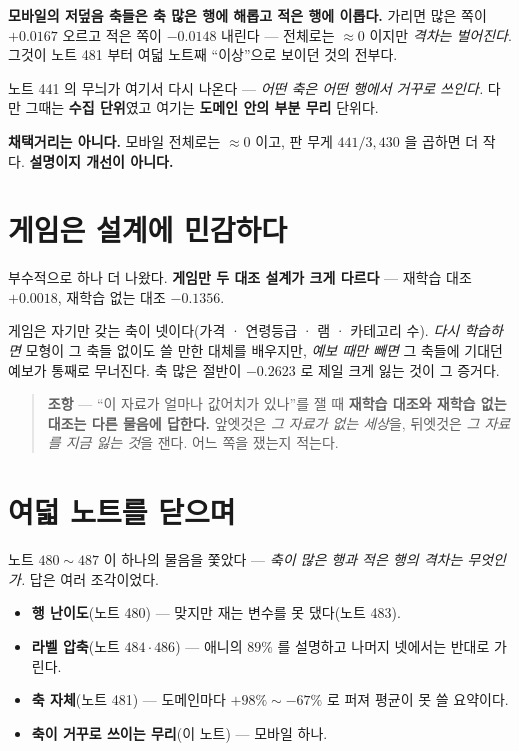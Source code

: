 \documentclass[11pt]{article}
\begin{document}
\textbf{모바일의 저덮음 축들은 축 많은 행에 해롭고 적은 행에 이롭다.}
가리면 많은 쪽이 $+0.0167$ 오르고 적은 쪽이 $-0.0148$ 내린다 --- 전체로는
$\approx 0$ 이지만 \emph{격차는 벌어진다}. 그것이 노트 481 부터 여덟
노트째 ``이상''으로 보이던 것의 전부다.

노트 441 의 무늬가 여기서 다시 나온다 --- \emph{어떤 축은 어떤 행에서
거꾸로 쓰인다.} 다만 그때는 \textbf{수집 단위}였고 여기는 \textbf{도메인
안의 부분 무리} 단위다.

\textbf{채택거리는 아니다.} 모바일 전체로는 $\approx 0$ 이고, 판 무게
$441/3{,}430$ 을 곱하면 더 작다. \textbf{설명이지 개선이 아니다.}

\section{게임은 설계에 민감하다}

부수적으로 하나 더 나왔다. \textbf{게임만 두 대조 설계가 크게 다르다}
--- 재학습 대조 $+0.0018$, 재학습 없는 대조 $-0.1356$.

게임은 자기만 갖는 축이 넷이다(가격 · 연령등급 · 램 · 카테고리 수).
\emph{다시 학습하면} 모형이 그 축들 없이도 쓸 만한 대체를 배우지만,
\emph{예보 때만 빼면} 그 축들에 기대던 예보가 통째로 무너진다. 축 많은
절반이 $-0.2623$ 로 제일 크게 잃는 것이 그 증거다.

\begin{quote}
\textbf{조항} --- ``이 자료가 얼마나 값어치가 있나''를 잴 때 \textbf{재학습
대조와 재학습 없는 대조는 다른 물음에 답한다.} 앞엣것은 \emph{그 자료가
없는 세상}을, 뒤엣것은 \emph{그 자료를 지금 잃는 것}을 잰다. 어느 쪽을
쟀는지 적는다.
\end{quote}

\section*{여덟 노트를 닫으며}

노트 $480 \sim 487$ 이 하나의 물음을 쫓았다 --- \emph{축이 많은 행과 적은
행의 격차는 무엇인가.} 답은 여러 조각이었다.

\begin{itemize}
\item \textbf{행 난이도}(노트 480) --- 맞지만 재는 변수를 못 댔다(노트 483).
\item \textbf{라벨 압축}(노트 $484 \cdot 486$) --- 애니의 $89\%$ 를
설명하고 나머지 넷에서는 반대로 가린다.
\item \textbf{축 자체}(노트 481) --- 도메인마다 $+98\% \sim -67\%$ 로
퍼져 평균이 못 쓸 요약이다.
\item \textbf{축이 거꾸로 쓰이는 무리}(이 노트) --- 모바일 하나.
\end{itemize}
\end{document}
